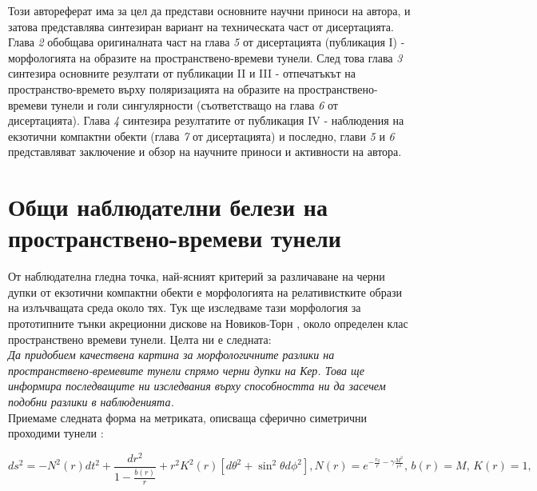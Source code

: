 \documentclass[12pt]{article}
\numberwithin{equation}{section}
\numberwithin{figure}{section}
\begin{document}
	Този автореферат има за цел да представи основните научни приноси на автора, и затова представлява синтезиран вариант на техническата част от дисертацията. Глава \emph{2} обобщава оригиналната част на глава \emph{5} от дисертацията (публикация I) - морфологията на образите на пространствено-времеви тунели. След това глава \emph{3} синтезира основните резултати от публикации II и III - отпечатъкът на пространство-времето върху поляризацията на образите на пространствено-времеви тунели и голи сингулярности (съответстващо на глава \emph{6} от дисертацията). Глава \emph{4} синтезира резултатите от публикация IV - наблюдения на екзотични компактни обекти (глава \emph{7} от дисертацията) и последно, глави \emph{5} и \emph{6} представляват заключение и обзор на научните приноси и активности на автора.
	
	\newpage
	
	\section{Общи наблюдателни белези на пространствено-времеви тунели}
	От наблюдателна гледна точка, най-ясният критерий за различаване на черни дупки от екзотични компактни обекти е морфологията на релативистките образи на излъчващата среда около тях. Тук ще изследваме тази морфология за прототипните тънки акреционни дискове на Новиков-Торн \cite{Page1973}, около определен клас пространствено времеви тунели. Целта ни е следната:\\
	
	\noindent\emph{Да придобием качествена картина за морфологичните разлики на пространствено-времевите тунели спрямо черни дупки на Кер. Това ще информира последващите ни изследвания върху способността ни да засечем подобни разлики в наблюденията.}\\
	
	\noindent Приемаме следната форма на метриката, описваща сферично симетрични проходими тунели \cite{Morris1988}:
	
	\begin{subequations}
		\begin{equation}
			ds^2 = -N^2(r)dt^2 + \frac{dr^2}{1 - \frac{b(r)}{r}} + r^2K^2(r)\left[d\theta^2 + \sin^2\theta d\phi^2\right],
		\end{equation}
		\begin{equation}
			N(r) = e^{-\frac{r_0}{r} - \gamma\frac{M^2}{r^2}},\, b(r) = M,\, K(r) = 1,
		\end{equation}	
	\end{subequations}
	
\end{document}
